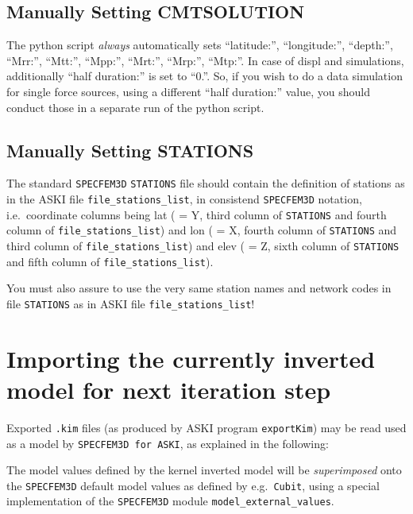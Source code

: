 \documentclass[12pt,a4paper]{article}
\newcommand{\lcode}[1]{\nolinkurl{#1}}
\newcommand{\lcodetitle}[1]{ {\ttfamily #1} }
\newcommand{\ASKI}{ {\ttfamily ASKI} }
\begin{document}
\subsection{Manually Setting \lcodetitle{CMTSOLUTION}}
%
The python script \emph{always} automatically sets ``latitude:'', ``longitude:'', ``depth:'', 
``Mrr:'', ``Mtt:'', ``Mpp:'', ``Mrt:'', ``Mrp:'', ``Mtp:''. In case of displ and simulations, additionally 
``half duration:'' is set to ``0.''. So, if you wish to do a data simulation for single force sources, 
using a different ``half duration:'' value, you should conduct those in a separate run of the python script.
%
\subsection{Manually Setting \lcodetitle{STATIONS}}
%
The standard \lcode{SPECFEM3D} \lcode{STATIONS} file should contain the definition of stations as
in the \ASKI file \lcode{file_stations_list}, in consistend \lcode{SPECFEM3D} notation, i.e.\ coordinate
columns being lat ( = Y, third column of \lcode{STATIONS} and fourth column of \lcode{file_stations_list}) and 
lon ( = X, fourth column of \lcode{STATIONS} and third column of \lcode{file_stations_list}) and 
elev ( = Z, sixth column of \lcode{STATIONS} and fifth column of \lcode{file_stations_list}). 

You must also assure to use the very same station names and network codes in file \lcode{STATIONS} as in 
\ASKI file \lcode{file_stations_list}!
%
\section{Importing the currently inverted model for next iteration step} \label{import_model}
%
Exported \lcode{.kim} files (as produced by \ASKI program \lcode{exportKim}) may be read used as a model by 
\lcode{SPECFEM3D for ASKI}, as explained in the following:

The model values defined by the kernel inverted model will be \emph{superimposed} onto the \lcode{SPECFEM3D} 
default model values as defined by e.g.\ \lcode{Cubit}, using a special implementation of the \lcode{SPECFEM3D} 
module \lcode{model_external_values}.
\end{document}
